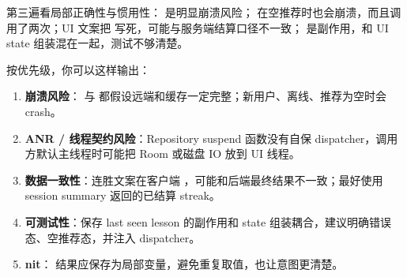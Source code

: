 第三遍看局部正确性与惯用性： 是明显崩溃风险； 在空推荐时也会崩溃，而且调用了两次；UI 文案把  写死，可能与服务端结算口径不一致； 是副作用，和 UI state 组装混在一起，测试不够清楚。

按优先级，你可以这样输出：
\begin{enumerate}
  \item \textbf{崩溃风险}： 与  都假设远端和缓存一定完整；新用户、离线、推荐为空时会 crash。
  \item \textbf{ANR / 线程契约风险}：Repository suspend 函数没有自保 dispatcher，调用方默认主线程时可能把 Room 或磁盘 IO 放到 UI 线程。
  \item \textbf{数据一致性}：连胜文案在客户端 ，可能和后端最终结果不一致；最好使用 session summary 返回的已结算 streak。
  \item \textbf{可测试性}：保存 last seen lesson 的副作用和 state 组装耦合，建议明确错误态、空推荐态，并注入 dispatcher。
  \item \textbf{nit}： 结果应保存为局部变量，避免重复取值，也让意图更清楚。
\end{enumerate}


